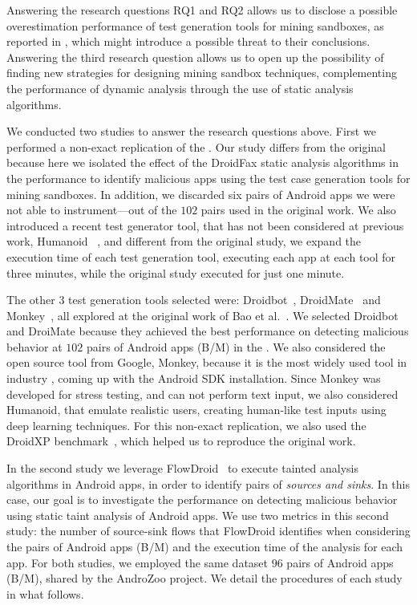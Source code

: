 Answering the research questions RQ1 and RQ2 allows us to disclose a possible overestimation performance of test generation tools for mining sandboxes,
as reported in \blls, which might introduce a possible threat to their conclusions. Answering the third research question
allows us to open up the possibility of finding new strategies for designing mining sandbox techniques, complementing the performance of
dynamic analysis through the use of static analysis algorithms.

We conducted two studies to answer the research questions above. First we performed a non-exact replication of the \blls. Our study differs from the original because here we isolated the effect of the DroidFax static analysis algorithms in the performance to identify malicious apps using the test case generation tools for
mining sandboxes. In addition, we discarded six pairs of
Android apps we were not able to instrument---out of the $102$ pairs used in the original work. We also introduced a recent test generator tool, that has not been considered at previous work, Humanoid ~\cite{DBLP:conf/kbse/LiY0C19}, and different from the original study, we expand the execution time of each test generation tool, executing each app at each tool for three minutes, while the original study executed for just one minute.

The other $3$ test generation tools selected were: Droidbot~\cite{DBLP:conf/icse/LiYGC17},
DroidMate~\cite{DBLP:conf/icse/JamrozikZ16} and Monkey~\cite{Monkey}, all explored at the original work of Bao et al.~\cite{DBLP:conf/icse/JamrozikZ16}. We selected Droidbot and DroiMate because they achieved
the best performance on detecting malicious behavior at $102$ pairs of Android apps (B/M) in the \blls. We also considered the open source tool from Google, Monkey, because it is the most widely used tool in industry \cite{DBLP:conf/sigsoft/ZengLZXDLYX16}, coming up with the Android SDK installation. Since Monkey was developed for stress testing, and can not perform text input, we also considered Humanoid, that emulate realistic users, creating human-like test inputs using deep learning techniques.
For this non-exact replication, we also used the DroidXP benchmark~\cite{DBLP:conf/scam/CostaMCMVBC20},
which helped us to reproduce the original work.

In the second study we leverage FlowDroid~\cite{DBLP:conf/pldi/ArztRFBBKTOM14} to execute
tainted analysis algorithms in Android apps, in order to identify pairs of \emph{sources and sinks}. In this case,
our goal is to investigate the performance on detecting malicious
behavior using static taint analysis of Android apps. We use two metrics in this second study: the number
of source-sink flows that FlowDroid identifies when considering the pairs of Android apps (B/M) and the
execution time of the analysis for each app.
For both studies, we employed the same dataset $96$ pairs of Android apps (B/M),
shared by the AndroZoo \cite{DBLP:conf/msr/AllixBKT16} project. We detail the procedures of each study in what follows.

